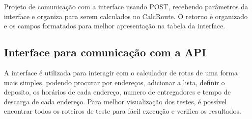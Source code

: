 Projeto de comunicação com a interface usando POST, recebendo parâmetros da interface e organiza para serem calculados no CalcRoute. 
O retorno é organizado e os campos formatados para melhor apresentação na tabela da interface.

\subsection{Interface para comunicação com a API}

A interface é utilizada para interagir com o calculador de rotas de uma forma mais simples, podendo procurar por endereços, adicionar a lista, definir o deposito, os horários de cada endereço, numero de entregadores e tempo de descarga de cada endereço. Para melhor visualização dos testes, é possível encontrar todos os roteiros de teste para fácil execução e verifica os resultados.

\begin{center}
	\label{fig:Interface}
\end{center}

